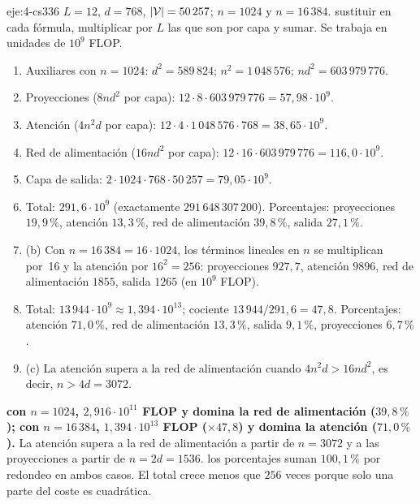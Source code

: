 \begin{solucion}{eje:4-cs336}
\datos $L=12$, $d=768$, $\lvert\mathcal{V}\rvert=50\,257$; $n=1024$ y $n=16\,384$.
\planteamiento sustituir en cada fórmula, multiplicar por $L$ las que son por capa y sumar. Se trabaja en unidades de $10^{9}$ FLOP.
\pasos
\begin{enumerate}[label=\arabic*.]
  \item Auxiliares con $n=1024$: $d^{2}=589\,824$; $n^{2}=1\,048\,576$; $nd^{2}=603\,979\,776$.
  \item Proyecciones ($8nd^{2}$ por capa): $12\cdot8\cdot603\,979\,776=57{,}98\cdot10^{9}$.
  \item Atención ($4n^{2}d$ por capa): $12\cdot4\cdot1\,048\,576\cdot768=38{,}65\cdot10^{9}$.
  \item Red de alimentación ($16nd^{2}$ por capa): $12\cdot16\cdot603\,979\,776=116{,}0\cdot10^{9}$.
  \item Capa de salida: $2\cdot1024\cdot768\cdot50\,257=79{,}05\cdot10^{9}$.
  \item Total: $291{,}6\cdot10^{9}$ (exactamente $291\,648\,307\,200$). Porcentajes: proyecciones $19{,}9\,\%$, atención $13{,}3\,\%$, red de alimentación $39{,}8\,\%$, salida $27{,}1\,\%$.
  \item (b) Con $n=16\,384=16\cdot1024$, los términos lineales en $n$ se multiplican por~16 y la atención por $16^{2}=256$: proyecciones $927{,}7$, atención $9896$, red de alimentación $1855$, salida $1265$ (en $10^{9}$ FLOP).
  \item Total: $13\,944\cdot10^{9}\approx1{,}394\cdot10^{13}$; cociente $13\,944/291{,}6=47{,}8$. Porcentajes: atención $71{,}0\,\%$, red de alimentación $13{,}3\,\%$, salida $9{,}1\,\%$, proyecciones $6{,}7\,\%$.
  \item (c) La atención supera a la red de alimentación cuando $4n^{2}d>16nd^{2}$, es decir, $n>4d=3072$.
\end{enumerate}
\resultado \textbf{con $n=1024$, $2{,}916\cdot10^{11}$ FLOP y domina la red de alimentación ($39{,}8\,\%$); con $n=16\,384$, $1{,}394\cdot10^{13}$ FLOP ($\times47{,}8$) y domina la atención ($71{,}0\,\%$).} La atención supera a la red de alimentación a partir de $n=3072$ y a las proyecciones a partir de $n=2d=1536$.
\comprobacion los porcentajes suman $100{,}1\,\%$ por redondeo en ambos casos. El total crece menos que $256$ veces porque solo una parte del coste es cuadrática.
\end{solucion}

